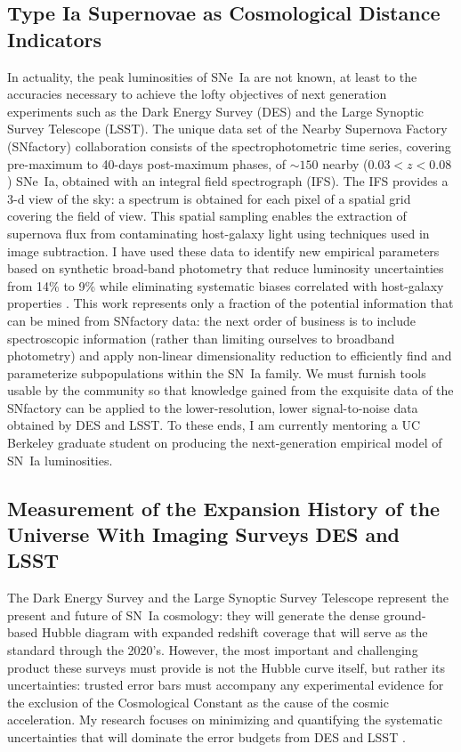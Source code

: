 \documentclass[12pt]{article}
\begin{document}
\subsection{Type Ia Supernovae as Cosmological Distance Indicators}
In actuality, the peak luminosities of SNe~Ia are not known, at least to the accuracies necessary
to achieve the lofty objectives of next generation experiments such as the Dark Energy Survey (DES) and the Large Synoptic
Survey Telescope (LSST).  The unique data set of
the Nearby Supernova Factory (SNfactory) collaboration consists of the spectrophotometric
time series, covering pre-maximum to 40-days post-maximum phases,
of  $\sim 150$ nearby ($0.03<z<0.08$) SNe~Ia, obtained with an integral field spectrograph (IFS).
The IFS provides a 3-d view of the sky: a spectrum is obtained for each pixel of a spatial grid covering
the field of view.   This spatial sampling enables the extraction of supernova flux from contaminating host-galaxy
light using  techniques used in image subtraction.
I have used these data  to identify new
empirical
parameters based on synthetic broad-band photometry that reduce luminosity uncertainties from 14\% to 9\% \cite{2013ApJ...766...84K}
while eliminating systematic biases correlated with host-galaxy
properties \cite{2014ApJ...784...51K}.  This work represents only a fraction of the
potential information that can be mined from  SNfactory data: the next order of business
is to include spectroscopic information (rather than limiting ourselves to broadband photometry)
and apply non-linear dimensionality reduction to efficiently find and parameterize
subpopulations   within the SN~Ia family.  We must furnish tools usable by the community so that
knowledge gained from the
exquisite data of the SNfactory can be applied to the lower-resolution, lower signal-to-noise data obtained
by DES and LSST.  To these ends, I am currently mentoring a UC Berkeley graduate student on producing the next-generation empirical
model of SN~Ia luminosities.

\subsection{Measurement of the Expansion History of the Universe With Imaging Surveys  DES and LSST}
The Dark Energy Survey and the Large Synoptic Survey Telescope represent the present and future of
SN~Ia cosmology: they
will generate the dense ground-based Hubble diagram with expanded redshift coverage that will serve as the standard 
through the 2020's.  However,
the most important and challenging product these surveys must provide is not the Hubble curve itself,
but rather its uncertainties: trusted error bars must accompany any experimental evidence for the exclusion
of the Cosmological
Constant as the cause of the cosmic acceleration. My research focuses on
minimizing and quantifying the
systematic uncertainties that will dominate the error budgets from DES and LSST \cite{2004MNRAS.347..909K}.  
\end{document}

